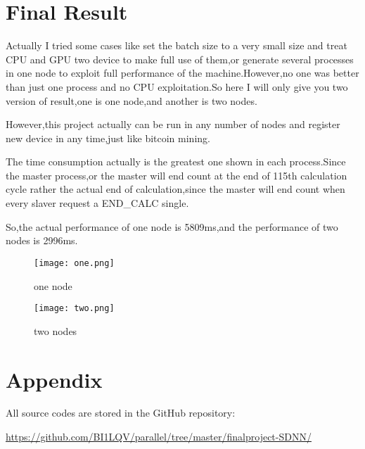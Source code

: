 \documentclass[12pt]{scrartcl} %
\begin{document}
\section{Final Result}
Actually I tried some cases like set the batch size to a very small size and treat CPU and GPU two device to make full use of them,or generate several processes in one node to exploit full performance of the machine.However,no one was better than just one process and no CPU exploitation.So here I will only give you two version of result,one is one node,and another is two nodes.

However,this project actually can be run in any number of nodes and register new device in any time,just like bitcoin mining.

The time consumption actually is the greatest one shown in each process.Since the master process,or the master will end count at the end of 115th calculation cycle rather the actual end of calculation,since the master will end count when every slaver request a END\_CALC single.

So,the actual performance of one node is 5809ms,and the performance of two nodes is 2996ms.
\begin{figure}[H]
    \centering
    \texttt{[image: one.png]}
    \caption{one node}
    \label{}
\end{figure}
\begin{figure}[H]
    \centering
    \texttt{[image: two.png]}
    \caption{two nodes}
    \label{}
\end{figure}
\section{Appendix}
All source codes are stored in the GitHub repository:


\url{https://github.com/BI1LQV/parallel/tree/master/finalproject-SDNN/}
\end{document}
